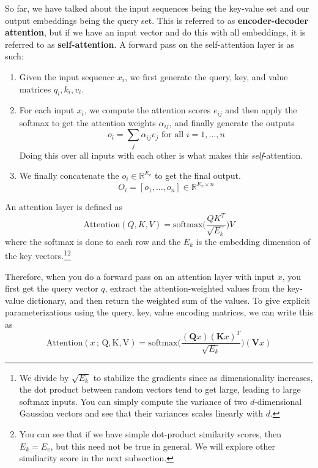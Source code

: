 \documentclass{article}
\begin{document}
    \begin{definition}
      So far, we have talked about the input sequences being the key-value set and our output embeddings being the query set. This is referred to as \textbf{encoder-decoder attention}, but if we have an input vector and do this with all embeddings, it is referred to as \textbf{self-attention}.\cite{vaswani2017attention} A forward pass on the self-attention layer is as such: 
      \begin{enumerate} 
        \item Given the input sequence $x_i$, we first generate the query, key, and value matrices $q_i, k_i, v_i$. 
        \item For each input $x_i$, we compute the attention scores $e_{ij}$ and then apply the softmax to get the attention weights $\alpha_{ij}$, and finally generate the outputs 
          \begin{equation} 
            o_i = \sum_j \alpha_{ij} v_j \text{ for all } i = 1, \ldots, n
          \end{equation}
          Doing this over all inputs with each other is what makes this \textit{self}-attention. 
        \item We finally concatenate the $o_i \in \mathbb{R}^{E_v}$ to get the final output. 
          \begin{equation} 
            O_i = [o_1, \ldots, o_n] \in \mathbb{R}^{E_v \times n}
          \end{equation}
      \end{enumerate}
      An attention layer is defined as 
      \begin{equation} 
        \mathrm{Attention}(Q, K, V) = \mathrm{softmax} \bigg( \frac{Q K^T}{\sqrt{E_k}} \bigg) V
      \end{equation}
      where the softmax is done to each row and the $E_k$ is the embedding dimension of the key vectors.\footnote{We divide by $\sqrt{E_k}$ to stabilize the gradients since as dimensionality increases, the dot product between random vectors tend to get large, leading to large softmax inputs. You can simply compute the variance of two $d$-dimensional Gaussian vectors and see that their variances scales linearly with $d$. }\footnote{You can see that if we have simple dot-product similarity scores, then $E_k = E_v$, but this need not be true in general. We will explore other similiarity score in the next subsection. } 

      Therefore, when you do a forward pass on an attention layer with input $x$, you first get the query vector $q$, extract the attention-weighted values from the key-value dictionary, and then return the weighted sum of the values. To give explicit parameterizations using the query, key, value encoding matrices, we can write this as 
      \begin{equation} 
        \mathrm{Attention}(x \,;\, \mathrm{Q}, \mathrm{K}, \mathrm{V}) = \mathrm{softmax} \bigg( \frac{(\mathbf{Q}x)(\mathbf{K} x)^T}{\sqrt{E_k}} \bigg) (\mathbf{V} x)
      \end{equation}

    \end{definition}
\end{document}
